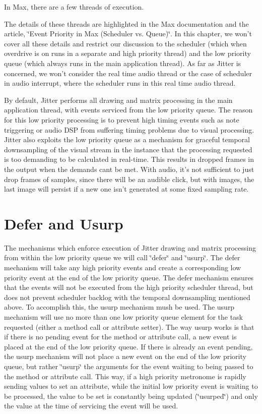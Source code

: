 In Max, there are a few threads of execution.

The details of these threads are highlighted in the Max documentation and the article, \char`\"{}Event Priority in Max (Scheduler vs. Queue)\char`\"{}. In this chapter, we won't cover all these details and restrict our discussion to the scheduler (which when overdrive is on runs in a separate and high priority thread) and the low priority queue (which always runs in the main application thread). As far as Jitter is concerned, we won't consider the real time audio thread or the case of scheduler in audio interrupt, where the scheduler runs in this real time audio thread.

By default, Jitter performs all drawing and matrix processing in the main application thread, with events serviced from the low priority queue. The reason for this low priority processing is to prevent high timing events such as note triggering or audio DSP from suffering timing problems due to visual processing. Jitter also exploits the low priority queue as a mechanism for graceful temporal downsampling of the visual stream in the instance that the processing requested is too demanding to be calculated in real-\/time. This results in dropped frames in the output when the demands cant be met. With audio, it's not sufficient to just drop frames of samples, since there will be an audible click, but with images, the last image will persist if a new one isn't generated at some fixed sampling rate.\hypertarget{chapter_jit_sched_chapter_jit_sched_usurp}{}\section{Defer and Usurp}\label{chapter_jit_sched_chapter_jit_sched_usurp}
The mechanisms which enforce execution of Jitter drawing and matrix processing from within the low priority queue we will call \char`\"{}defer\char`\"{} and \char`\"{}usurp\char`\"{}. The defer mechanism will take any high priority events and create a corresponding low priority event at the end of the low priority queue. The defer mechanism ensures that the events will not be executed from the high priority scheduler thread, but does not prevent scheduler backlog with the temporal downsampling mentioned above. To accomplish this, the usurp mechanism mush be used. The usurp mechanism will use no more than one low priority queue element for the task requested (either a method call or attribute setter). The way usurp works is that if there is no pending event for the method or attribute call, a new event is placed at the end of the low priority queue. If there is already an event pending, the usurp mechanism will not place a new event on the end of the low priority queue, but rather \char`\"{}usurp\char`\"{} the arguments for the event waiting to being passed to the method or attribute call. This way, if a high priority metronome is rapidly sending values to set an attribute, while the initial low priority event is waiting to be processed, the value to be set is constantly being updated (\char`\"{}usurped\char`\"{}) and only the value at the time of servicing the event will be used.

